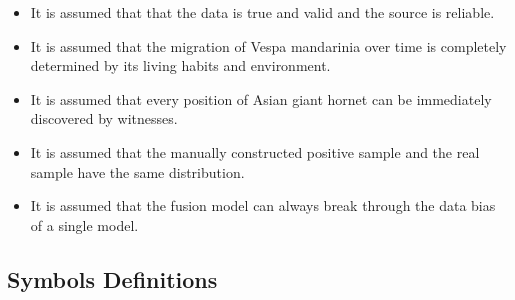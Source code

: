 \documentclass{mcmthesis}
\numberwithin{figure}{section}
\numberwithin{table}{section}
\begin{document}
\begin{itemize}
\item It is assumed that that the data is true and valid and the source is reliable.

\item It is assumed that the migration of Vespa mandarinia over time is completely determined by its living habits and environment.

\item It is assumed that every position of Asian giant hornet can be immediately discovered by witnesses.


\item It is assumed that the manually constructed positive sample and the real sample have the same distribution.


\item It is assumed that the fusion model can always break through the data bias of a single model.


\end{itemize}


\subsection{Symbols Definitions}
\end{document}
